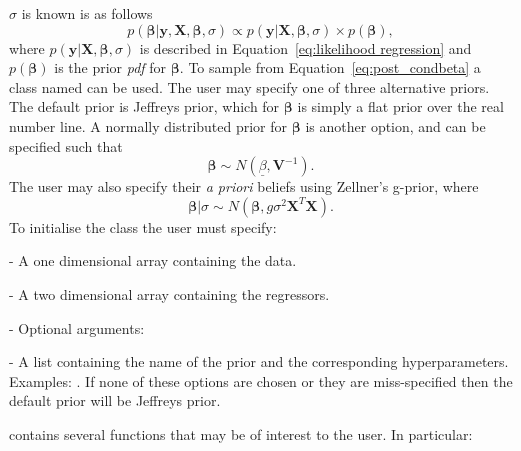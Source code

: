 \documentclass[article]{jss}
\begin{document}
$\sigma$ is known is as follows
\begin{equation} 
p\left(\bm{\beta}|\bm{y},\bm{X},\bm{\beta},\sigma\right)\propto
  p(\bm{y}|\bm{X},\bm{\beta},\sigma)\times
  p(\bm{\beta}),\label{eq:post_condbeta}
\end{equation} where
$p(\bm{y}|\bm{X},\bm{\beta},\sigma)$ is described in
Equation~\ref{eq:likelihood regression} and $p(\bm{\beta})$ is the prior
\emph{pdf} for $\bm{\beta}.$ To sample from Equation~\ref{eq:post_condbeta} a
class named  can be used. The user may
specify one of three alternative priors.  The default prior is
Jeffreys prior, which for $\bm{\beta}$ is simply a flat prior over
the real number line. A normally distributed prior for $\bm{\beta}$ is
another option, and can be specified such that\[ \bm{\beta}\sim
N\left(\underline{\beta},\bm{V}^{-1}\right).\] The user may also
specify their \emph{a priori} beliefs using Zellner's g-prior, where\[
\bm{\beta}|\sigma\sim
N\left(\bm{\beta},g\sigma^{2}\bm{X}^{T}\bm{X}\right).\] To initialise
the class the user must specify:
\begin{description}
\item {} - A one dimensional  array containing the
  data.
\item {} - A two dimensional  array containing the
  regressors.
\item {} - Optional arguments:

\begin{description}
\item {} - A list containing the name of the prior and the
  corresponding hyperparameters. Examples: \newline
  . \newline If none of these options are chosen or
  they are miss-specified then the default prior will be Jeffreys
  prior.
\end{description}
\end{description}
 contains several functions that may be of
interest to the user. In particular:
\end{document}
